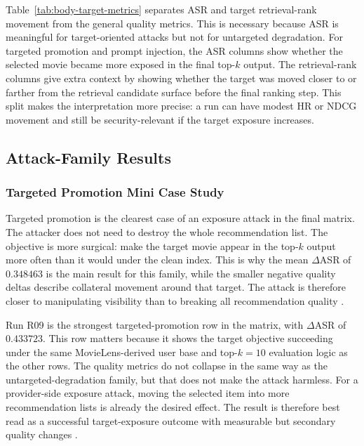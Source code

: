 

Table~\ref{tab:body-target-metrics} separates ASR and target retrieval-rank movement from the general quality metrics. This is necessary because ASR is meaningful for target-oriented attacks but not for untargeted degradation. For targeted promotion and prompt injection, the ASR columns show whether the selected movie became more exposed in the final top-$k$ output. The retrieval-rank columns give extra context by showing whether the target was moved closer to or farther from the retrieval candidate surface before the final ranking step. This split makes the interpretation more precise: a run can have modest HR or NDCG movement and still be security-relevant if the target exposure increases.

\subsection{Attack-Family Results}


\subsubsection{Targeted Promotion Mini Case Study}

Targeted promotion is the clearest case of an exposure attack in the final matrix. The attacker does not need to destroy the whole recommendation list. The objective is more surgical: make the target movie appear in the top-$k$ output more often than it would under the clean index. This is why the mean $\Delta$ASR of $0.348463$ is the main result for this family, while the smaller negative quality deltas describe collateral movement around that target. The attack is therefore closer to manipulating visibility than to breaking all recommendation quality \cite{ragpoisonlab_repo,nguyen2024manipulatingrecsys,wang2024recpoisonsurvey}.

Run R09 is the strongest targeted-promotion row in the matrix, with $\Delta$ASR of $0.433723$. This row matters because it shows the target objective succeeding under the same MovieLens-derived user base and top-$k=10$ evaluation logic as the other rows. The quality metrics do not collapse in the same way as the untargeted-degradation family, but that does not make the attack harmless. For a provider-side exposure attack, moving the selected item into more recommendation lists is already the desired effect. The result is therefore best read as a successful target-exposure outcome with measurable but secondary quality changes \cite{ragpoisonlab_repo}.

